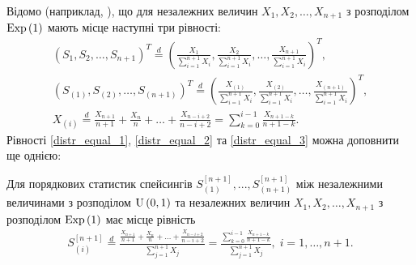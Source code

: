Відомо (наприклад, \cite{Holst_1980}), що для незалежних величин 
$X_1, X_2, \dots, X_{n+1}$ з розподілом $\mathrm{Exp}\left(1\right)$
мають місце наступні три рівності:
\begin{gather}
    \label{distr_equal_1}
    \left(
        S_1, S_2, \dots, S_{n+1}
    \right)^T
    \overset{d}{=}
    \left(
        \frac{X_1}{\sum_{i=1}^{n+1} X_i},
        \frac{X_2}{\sum_{i=1}^{n+1} X_i},
        \dots,
        \frac{X_{n+1}}{\sum_{i=1}^{n+1} X_i}
    \right)^T, \\
    \label{distr_equal_2}
    \left(
        S_{(1)}, S_{(2)}, \dots, S_{(n+1)}
    \right)^T
    \overset{d}{=}
    \left(
        \frac{X_{(1)}}{\sum_{i=1}^{n+1} X_i},
        \frac{X_{(2)}}{\sum_{i=1}^{n+1} X_i},
        \dots,
        \frac{X_{(n+1)}}{\sum_{i=1}^{n+1} X_i}
    \right)^T, \\
    \label{distr_equal_3}
    X_{(i)} \overset{d}{=}
    \frac{X_{n+1}}{n+1} + \frac{X_{n}}{n} + \dots + \frac{X_{n-i+2}}{n-i+2} = 
    \sum_{k=0}^{i-1} \frac{X_{n+1-k}}{n+1-k}.
\end{gather}
Рівності \eqref{distr_equal_1}, \eqref{distr_equal_2} та \eqref{distr_equal_3}
можна доповнити ще однією:
\begin{lemma}\label{distr_equal}
    Для порядкових статистик спейсингів 
    $S_{(1)}^{[n+1]}, ..., S_{(n+1)}^{[n+1]}$
    між незалежними величинами з розподілом $\mathrm{U}\left(0, 1\right)$
    та незалежних величин 
    $X_1, X_2, \dots, X_{n+1}$ з розподілом $\mathrm{Exp}\left(1\right)$ має місце
    рівність 
    \begin{gather}\label{distr_equal_4}
        S_{(i)}^{[n+1]} \overset{d}{=}
        \frac{
            \frac{X_{n+1}}{n+1} + \frac{X_{n}}{n} + \dots + \frac{X_{n-i+2}}{n-i+2}
        }{
            \sum_{j=1}^{n+1} X_j
        } = \frac{
            \sum_{k=0}^{i-1} \frac{X_{n+1-k}}{n+1-k}
        }{
            \sum_{j=1}^{n+1} X_j
        }, \; i = 1, \dots, n+1.
    \end{gather}
\end{lemma}
